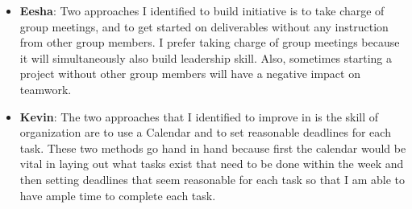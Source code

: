 \documentclass[12pt, titlepage]{article}
\begin{document}
\begin{enumerate}
\begin{itemize}
			\item \textbf{Eesha}: Two approaches I identified to build initiative is to take charge of group meetings, and to get started on deliverables without any instruction from other group members. I prefer taking charge of group meetings because it will simultaneously also build leadership skill. Also, sometimes starting a project without other group members will have a negative impact on teamwork.
			
			\item \textbf{Kevin}: The two approaches that I identified to improve in is the skill of organization are to use a Calendar and to set reasonable deadlines for each task. These two methods go hand in hand because first the calendar would be vital in laying out what tasks exist that need to be done within the week and then setting deadlines that seem reasonable for each task so that I am able to have ample time to complete each task.  
		\end{itemize}
	\end{enumerate}
	
\end{document}

